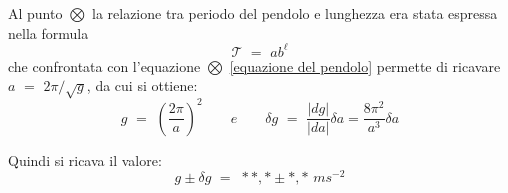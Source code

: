 Al punto $\bigotimes$ la relazione tra periodo del pendolo e lunghezza era stata espressa nella formula
\begin{equation*}
	\mathcal{T} \,\, = \,\, ab^{\ell}
\end{equation*}
che confrontata con l'equazione $\bigotimes$ \ref{equazione del pendolo} permette di ricavare $a \,\, = \,\, 2 \pi / \sqrt{g}$, da cui si ottiene:
\begin{equation}
	g \,\, = \,\, \left( \frac{2 \pi}{a}\right)^2 \quad\quad e \quad\quad \delta g \,\, = \,\, \frac{\vert dg \vert}{\vert da\vert} \delta a = \frac{8 \pi^2}{a^3} \delta a
\end{equation}

Quindi si ricava il valore:
\begin{equation}
	g \pm \delta g \,\, = \,\, \ast\ast,\ast \pm \ast,\ast \,\, ms^{-2}
\end{equation}